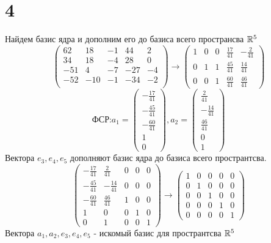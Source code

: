 \section*{4}
Найдем базис ядра и дополним его до базиса всего пространсва $\mathbb{R}^5$ \\
$$\begin{pmatrix}
	62 & 18 & -1 & 44 & 2 \\
	34 & 18 & -4 & 28 & 0 \\
	-51 & 4 & -7 & -27 & -4 \\
	-52 & -10 & -1 & -34 & -2 \\
\end{pmatrix}\to \begin{pmatrix} 
1 & 0 & 0 & \frac{17}{41} & -\frac{2}{41} \\
0 & 1 & 1 & \frac{45}{41} & \frac{14}{41} \\
0 & 0 & 1 & \frac{60}{41} & \frac{46}{41}
\end{pmatrix}$$
$$\text{ФСР:} a_1 = \begin{pmatrix}
	-\frac{17}{41} \\
	-\frac{45}{41} \\
	-\frac{60}{41} \\
	1 \\
	0
\end{pmatrix}, a_2 = \begin{pmatrix}
\frac{2}{41} \\
-\frac{14}{41} \\
\frac{46}{41} \\
0 \\
1
\end{pmatrix}$$
Вектора $e_3,e_4,e_5$ дополняют базис ядра до базиса всего пространтсва.
$$\begin{pmatrix}
	-\frac{17}{41} & \frac{2}{41}  & 0 & 0 & 0 \\
	-\frac{45}{41}& -\frac{14}{41} & 0 & 0 & 0\\
	-\frac{60}{41}& \frac{46}{41} &1 & 0 & 0\\
	1 & 0 &0 & 1 & 0\\
	0& 1 & 0 & 0 & 1
\end{pmatrix}\to \begin{pmatrix}
1& 0 & 0 & 0& 0 \\
0 & 1 & 0 & 0 & 0\\
0 & 0 & 1 & 0 & 0\\
0 & 0 & 0& 1 & 0\\
0 & 0 & 0 & 0 & 1
\end{pmatrix}$$
Вектора  $a_1,a_2,e_3,e_4,e_5$ - искомый базис для пространтсва $\mathbb{R}^5$
